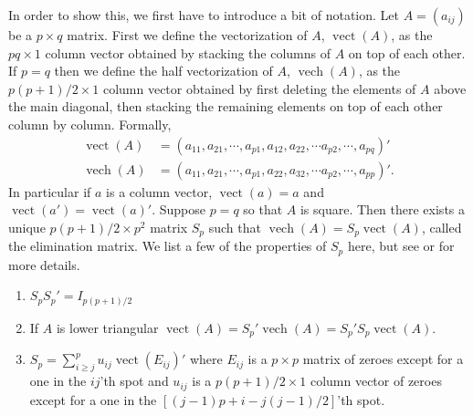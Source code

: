 \documentclass{article}
\DeclareMathOperator{\vect}{vect}
\DeclareMathOperator{\vech}{vech}
\begin{document}
In order to show this, we first have to introduce a bit of notation. Let $A=(a_{ij})$ be a $p\times q$ matrix. First we define the vectorization of $A$, $\vect(A)$, as the $pq\times 1$ column vector obtained by stacking the columns of $A$ on top of each other. If $p=q$ then we define the half vectorization of $A$, $\vech(A)$, as the $p(p+1)/2\times 1$ column vector obtained by first deleting the elements of $A$ above the main diagonal, then stacking the remaining elements on top of each other column by column. Formally,
\begin{align*}
  \vect(A) & = (a_{11}, a_{21}, \cdots, a_{p1}, a_{12}, a_{22}, \cdots a_{p2}, \cdots, a_{pq})'\\
  \vech(A) & = (a_{11}, a_{21}, \cdots, a_{p1}, a_{22}, a_{32}, \cdots a_{p2}, \cdots, a_{pp})'.
\end{align*}
In particular if $a$ is a column vector, $\vect(a)=a$ and $\vect(a')=\vect(a)'$. Suppose $p=q$ so that $A$ is square. Then there exists a unique $p(p+1)/2\times p^2$ matrix $S_p$ such that $\vech(A) = S_p\vect(A)$, called the elimination matrix. We list a few of the properties of $S_p$ here, but see \cite{magnus1980elimination} or \cite{magnus1988linear} for more details.
\begin{enumerate}
  \item $S_pS_p'=I_{p(p+1)/2}$
  \item If $A$ is lower triangular $\vect(A) = S_p'\vech(A) = S_p'S_p\vect(A)$.
  \item $S_p = \sum_{i\geq j}^pu_{ij}\vect(E_{ij})'$ where $E_{ij}$ is a $p\times p$ matrix of zeroes except for a one in the $ij$'th spot and $u_{ij}$ is a $p(p+1)/2\times 1$ column vector of zeroes except for a one in the $[(j-1)p + i - j(j-1)/2]$'th spot.
\end{enumerate}
\end{document}
